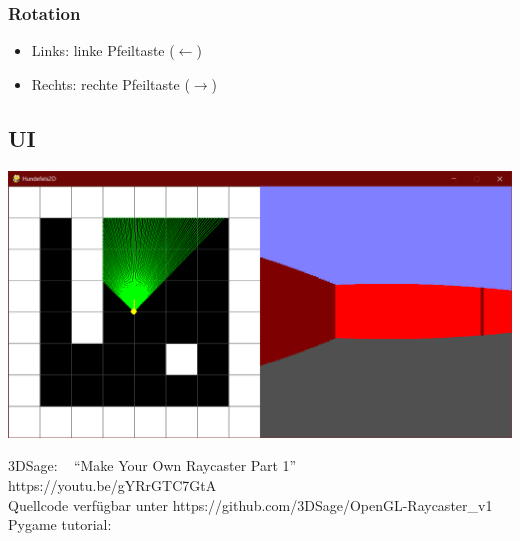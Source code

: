 \documentclass[a4paper,titlepage]{article}
\begin{document}
\subsubsection{Rotation}
\begin{itemize}
\item Links: linke Pfeiltaste ($\leftarrow$)
\item Rechts: rechte Pfeiltaste ($\rightarrow$)
\end{itemize}

\subsection{UI}
\includegraphics[scale=1.18]{./img/ui}

\newpage

\begin{flushleft}
\begin{thebibliography}{99}
 3DSage: ~ ``Make Your Own Raycaster Part 1'' ~ https://youtu.be/gYRrGTC7GtA\\ Quellcode verfügbar unter https://github.com/3DSage/OpenGL-Raycaster\_v1
 Pygame tutorial: 	
\end{thebibliography}
\end{flushleft}
\end{document}
